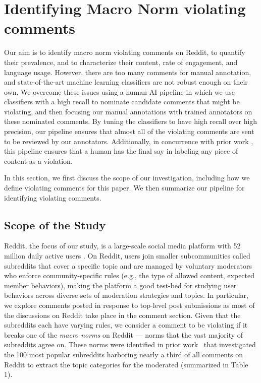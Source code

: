 \section{Identifying Macro Norm violating comments}
Our aim is to identify macro norm violating comments on Reddit, to quantify their prevalence, and to characterize their content, rate of engagement, and language usage. However, there are too many comments for manual annotation, and state-of-the-art machine learning classifiers are not robust enough on their own. We overcome these issues using a human-AI pipeline in which we use classifiers with a high recall to nominate candidate comments that might be violating, and then focusing our manual annotations with trained annotators on these nominated comments. By tuning the classifiers to have high recall over high precision, our pipeline ensures that almost all of the violating comments are sent to be reviewed by our annotators. Additionally, in concurrence with prior work \cite{chandrasekharan2019crossmod, seering2020reconsidering}, this pipeline ensures that a human has the final say in labeling any piece of content as a violation.

In this section, we first discuss the scope of our investigation, including how we define violating comments for this paper. We then summarize our pipeline for identifying violating comments. 

\subsection{Scope of the Study}



Reddit, the focus of our study, is a large-scale social media platform with 52 million daily active users \cite{59_Phan}. On Reddit, users join smaller subcommunities called subreddits that cover a specific topic and are managed by voluntary moderators who enforce community-specific rules (e.g., the type of allowed content, expected member behaviors), making the platform a good test-bed for studying user behaviors across diverse sets of moderation strategies and topics. In particular, we explore comments posted in response to top-level post submissions as most of the discussions on Reddit take place in the comment section. Given that the subreddits each have varying rules, we consider a comment to be violating if it breaks one of the \textit{macro norms} on Reddit --- norms that the vast majority of subreddits agree on. These norms were identified in prior work~\cite{Chandrasekharan2018internet} that investigated the 100 most popular subreddits harboring nearly a third of all comments on Reddit to extract the topic categories for the moderated (summarized in Table 1). 

